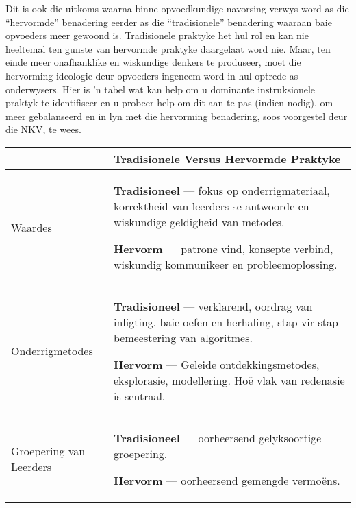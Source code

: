 Dit is ook die uitkoms waarna binne opvoedkundige navorsing verwys
word as die ``hervormde'' benadering eerder as die
``tradisionele'' benadering waaraan baie opvoeders meer gewoond is.
Tradisionele praktyke het hul rol en kan nie heeltemal ten gunste van
hervormde praktyke daargelaat word nie.
Maar, ten einde meer onafhanklike en wiskundige denkers te produseer,
moet die hervorming ideologie deur opvoeders ingeneem word in hul
optrede as onderwysers.
Hier is 'n tabel wat kan help om u dominante instruksionele praktyk te
identifiseer en u probeer help om dit aan te pas (indien nodig), om
meer gebalanseerd en in lyn met die hervorming benadering, soos
voorgestel deur die NKV, te wees.

\begin{table}[H]
  \begin{center}
    \begin{tabular}{|p{3.5cm}|p{8.5cm}|} \hline 
&
\textbf{Tradisionele Versus Hervormde Praktyke} \\ \hline
Waardes &
\textbf{Tradisioneel} --- fokus op onderrigmateriaal, korrektheid van leerders se antwoorde en wiskundige geldigheid van metodes.\par
\textbf{Hervorm} --- patrone vind, konsepte verbind, wiskundig kommunikeer en probleemoplossing. \\ \hline
Onderrigmetodes &
\textbf{Tradisioneel} --- verklarend, oordrag van inligting, baie oefen en herhaling, stap vir stap bemeestering van algoritmes.\par
\textbf{Hervorm} --- Geleide ontdekkingsmetodes, eksplorasie, modellering. Hoë vlak van redenasie is sentraal. \\ \hline
Groepering van Leerders &
\textbf{Tradisioneel} --- oorheersend gelyksoortige groepering. \par
\textbf{Hervorm} --- oorheersend gemengde vermo\"{e}ns. \\ \hline
    \end{tabular}
  \end{center}
\end{table}


